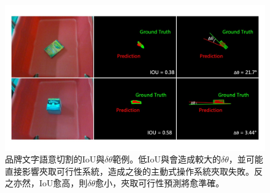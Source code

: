 \begin{figure}[ht]
	\centering
	\includegraphics[height=!, width=1.0\linewidth, keepaspectratio=true]
	{./figures/iou_deltatheta.jpg}
  \caption{品牌文字語意切割的IoU與$\delta\theta$範例。低IoU與會造成較大的$\delta\theta$，並可能直接影響夾取可行性系統，造成之後的主動式操作系統夾取失敗。反之亦然，IoU愈高，則$\delta\theta$愈小，夾取可行性預測將愈準確。}
  \label{figure:iou_deltatheta}
\end{figure}

